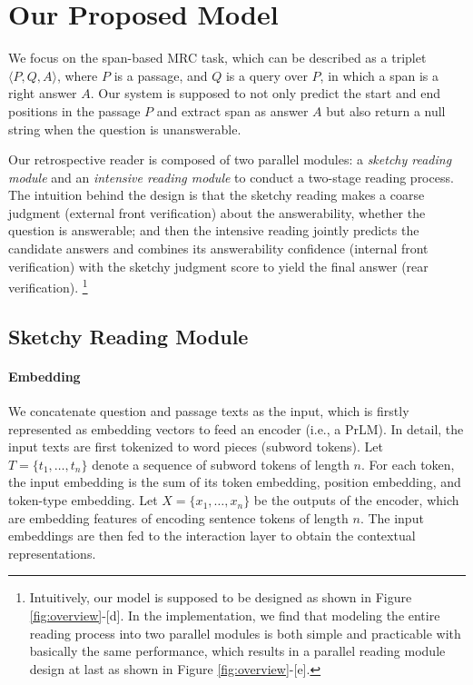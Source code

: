 \documentclass[letterpaper]{article} %
\begin{document}
\section{Our Proposed Model}
We focus on the span-based MRC task, which can be described as a triplet $\langle P, Q, A \rangle$, where $P$ is a passage, and $Q$ is a query over $P$, in which a span is a right answer $A$. Our system is supposed to not only predict the start and end positions in the passage $P$ and extract span as answer $A$ but also return a null string when the question is unanswerable.

Our retrospective reader is composed of two parallel modules: a \textit{sketchy reading module} and an \textit{intensive reading module} to conduct a two-stage reading process. The intuition behind the design is that the sketchy reading makes a coarse judgment (external front verification) about the answerability, whether the question is answerable; and then the intensive reading jointly predicts the candidate answers and combines its answerability confidence (internal front verification) with the sketchy judgment score to yield the final answer (rear verification).
\footnote{Intuitively, our model is supposed to be designed as shown in Figure \ref{fig:overview}-[d]. In the implementation, we find that modeling the entire reading process into two parallel modules is both simple and practicable with basically the same performance, which results in a parallel reading module design at last as shown in Figure \ref{fig:overview}-[e].}

\subsection{Sketchy Reading Module}
\paragraph{Embedding}
We concatenate question and passage texts as the input, which is firstly represented as embedding vectors to feed an encoder (i.e., a PrLM). In detail,
the input texts are first tokenized to word pieces (subword tokens). Let $T=\{t_1,\dots,t_n\}$ denote a sequence of subword tokens of length $n$.
For each token, the input embedding is the sum of its token embedding, position embedding, and token-type embedding.
Let $X = \{x_1, \dots, x_n\}$ be the outputs of the encoder, which are embedding features of encoding sentence tokens of length $n$. The input embeddings are then fed to the interaction layer to obtain the contextual representations.
\end{document}
